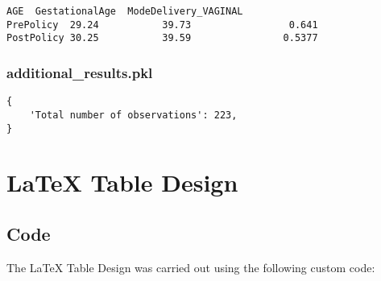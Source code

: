 \documentclass[11pt]{article}
\begin{document}
\begin{Verbatim}[tabsize=4]
             AGE  GestationalAge  ModeDelivery_VAGINAL
PrePolicy  29.24           39.73                 0.641
PostPolicy 30.25           39.59                0.5377
\end{Verbatim}

\subsubsection*{additional\_results.pkl}

\begin{Verbatim}[tabsize=4]
{
    'Total number of observations': 223,
}
\end{Verbatim}

\section{LaTeX Table Design} \subsection{Code}The LaTeX Table Design was carried out using the following custom code:
\end{document}
